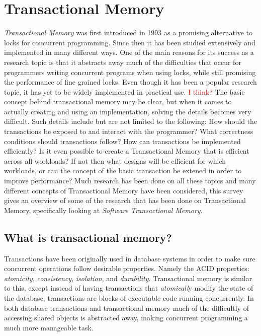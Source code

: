 










\section{Transactional Memory}
\emph{Transactional Memory} was first introduced in 1993 \cite{165164} as a promising alternative to locks for concurrent programming.
Since then it has been studied extensively and implemented in many different ways.
One of the main reasons for its success as a research topic is that it abstracts away much of the difficulties that occur for programmers writing concurrent programs when using locks, while still promising the performance of fine grained locks.
Even though it has been a popular research topic, it has yet to be widely implemented in practical use.
\textcolor{Red}{I think?}
The basic concept behind transactional memory may be clear, but when it comes to actually creating and using an implementation, solving the details becomes very difficult.
Such details include but are not limited to the following:
How should the transactions be exposed to and interact with the programmer?
What correctness conditions should transactions follow?
How can transactions be implemented efficiently?  Is it even possible to create a Transactional Memory that is efficient across all workloads?
If not then what designs will be efficient for which workloads, or can the concept of the basic transaction be extened in order to improve performance?
Much research has been done on all these topics and many different concepts of Transactional Memory have been considered, this survey gives an overview of some of the research that has been done on Transactional Memory, specifically looking at \emph{Software Transactional Memory}.

\subsection{What is transactional memory?}
Transactions have been originally used in database systems in order to make sure concurrent operations follow desirable properties.  Namely the ACID properties: \emph{atomicity}, \emph{consistency}, \emph{isolation}, and \emph{durability}.  Transactional memory is similar to this, except instead of having transactions that \emph{atomicall}y modify the state of the database, transactions are blocks of executable code running concurrently.
In both database transactions and transactional memory much of the difficultly of accessing shared objects is abstracted away, making concurrent programming a much more manageable task.

